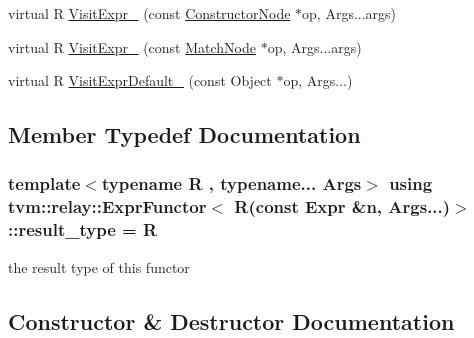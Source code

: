 \begin{DoxyCompactItemize}
\item 
virtual R \hyperlink{classtvm_1_1relay_1_1ExprFunctor_3_01R_07const_01Expr_01_6n_00_01Args_8_8_8_08_4_a0ee67c9fda21cc04e2b47be9846acb29}{Visit\+Expr\+\_\+} (const \hyperlink{namespacetvm_1_1relay_a6b95f70a9b44cc1c96593201594d1345}{Constructor\+Node} $\ast$op, Args...\+args)
\item 
virtual R \hyperlink{classtvm_1_1relay_1_1ExprFunctor_3_01R_07const_01Expr_01_6n_00_01Args_8_8_8_08_4_ae250830a2b91d5763c7c14ce65047bbe}{Visit\+Expr\+\_\+} (const \hyperlink{classtvm_1_1relay_1_1MatchNode}{Match\+Node} $\ast$op, Args...\+args)
\item 
virtual R \hyperlink{classtvm_1_1relay_1_1ExprFunctor_3_01R_07const_01Expr_01_6n_00_01Args_8_8_8_08_4_ab35a37c57578e32a8c873cdfe9e31a0f}{Visit\+Expr\+Default\+\_\+} (const Object $\ast$op, Args...)
\end{DoxyCompactItemize}


\subsection{Member Typedef Documentation}
\subsubsection[{\texorpdfstring{result\+\_\+type}{result_type}}]{\setlength{\rightskip}{0pt plus 5cm}template$<$typename R , typename... Args$>$ using {\bf tvm\+::relay\+::\+Expr\+Functor}$<$ R(const {\bf Expr} \&n, Args...)$>$\+::{\bf result\+\_\+type} =  R}\hypertarget{classtvm_1_1relay_1_1ExprFunctor_3_01R_07const_01Expr_01_6n_00_01Args_8_8_8_08_4_a4558886f7f179396ee11b5fe91927793}{}\label{classtvm_1_1relay_1_1ExprFunctor_3_01R_07const_01Expr_01_6n_00_01Args_8_8_8_08_4_a4558886f7f179396ee11b5fe91927793}


the result type of this functor 



\subsection{Constructor \& Destructor Documentation}
